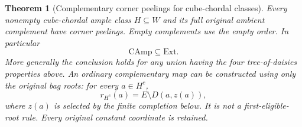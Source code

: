 \documentclass[11pt]{article}
\newtheorem{theorem}{Theorem}[section]
\theoremstyle{definition}
\begin{document}
\begin{theorem}[Complementary corner peelings for cube-chordal classes]
\label{thm:camp-ext}
Every nonempty cube-chordal ample class $H\subseteq W$ and its full
original ambient complement have corner peelings. Empty complements
use the empty order. In particular
\[
                         \mathrm{CAmp}\subseteq\mathrm{Ext}.
\]
More generally the conclusion holds for any union having the four
tree-of-daisies properties above. An ordinary complementary map can be
constructed using only the original bag roots: for every $a\in H^c$,
\begin{equation}\label{eq:tree-opposite}
                 r_{H^c}(a)=E\setminus D(a,z(a)),
\end{equation}
where $z(a)$ is selected by the finite completion below. It is not a
first-eligible-root rule. Every original constant coordinate is retained.
\end{theorem}
\end{document}
